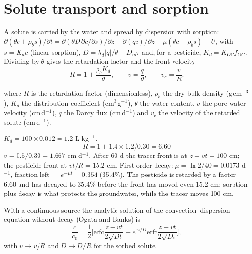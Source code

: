 \section{Solute transport and sorption}
A solute is carried by the water and spread by dispersion with sorption: $\partial(\theta c+\rho_bs)/\partial t=\partial(\theta D\,\partial c/\partial z)/\partial z-\partial(qc)/\partial z-\mu(\theta c+\rho_bs)-U$, with $s=K_dc$ (linear sorption), $D=\lambda_d|q|/\theta+D_m\tau$ and, for a pesticide, $K_d=K_{OC}f_{OC}$. Dividing by $\theta$ gives the retardation factor and the front velocity
\begin{equation}\boxed{R=1+\frac{\rho_bK_d}{\theta},\qquad v=\frac q\theta,\qquad v_c=\frac vR.}\end{equation}
\par\noindent where $R$ is the retardation factor (dimensionless), $\rho_b$ the dry bulk density (g\,cm$^{-3}$), $K_d$ the distribution coefficient (cm$^3$\,g$^{-1}$), $\theta$ the water content, $v$ the pore-water velocity (cm\,d$^{-1}$), $q$ the Darcy flux (cm\,d$^{-1}$) and $v_c$ the velocity of the retarded solute (cm\,d$^{-1}$).


\sol {}\ans $K_d=100\times0.012=1.2$ L kg$^{-1}$. \[R=1+1.4\times1.2/0.30=6.60\]
$v=0.5/0.30=1.667$ cm d$^{-1}$. After 60 d the tracer front is at $z=vt=100$ cm; the pesticide front at $vt/R=15.2$ cm. First-order decay: $\mu=\ln2/40=0.0173$ d$^{-1}$, fraction left $=e^{-\mu t}=0.354$ (35.4\%). The pesticide is retarded by a factor 6.60 and has decayed to 35.4\% before the front has moved even 15.2 cm: sorption plus decay is what protects the groundwater, while the tracer moves 100 cm. \finans


With a continuous source the analytic solution of the convection--dispersion equation without decay (Ogata and Banks) is
\begin{equation}\boxed{\frac{c}{c_0}=\frac12\Big[\mathrm{erfc}\frac{z-vt}{2\sqrt{Dt}}+e^{vz/D}\mathrm{erfc}\frac{z+vt}{2\sqrt{Dt}}\Big],}\end{equation}
with $v\to v/R$ and $D\to D/R$ for the sorbed solute.

